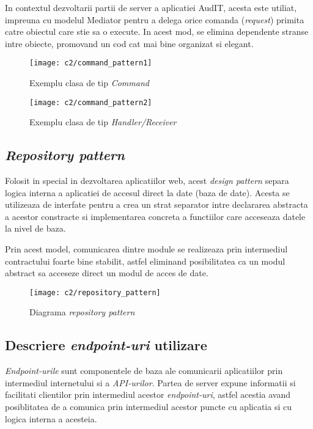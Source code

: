 In contextul dezvoltarii partii de server a aplicatiei AudIT, acesta este utiliat, impreuna cu modelul Mediator pentru a delega orice comanda (\textit{request}) primita catre obiectul care stie sa o execute. In acest mod, se elimina dependente stranse intre obiecte, promovand un cod cat mai bine organizat si elegant.\\

\vspace{1cm}
\begin{figure}[h]
	\centering
	
	\texttt{[image: c2/command\_pattern1]}
	\caption{Exemplu clasa de tip \textit{Command}}
\end{figure}



\vspace{1cm}
\begin{figure}[h]
	\centering
	
	\texttt{[image: c2/command\_pattern2]}
	\caption{Exemplu clasa de tip \textit{Handler/Receiver}}
\end{figure}


\subsection*{\textit{Repository pattern}}

Folosit in special in dezvoltarea aplicatiilor web, acest \textit{design pattern} separa logica interna a aplicatiei de accesul direct la date (baza de date). Acesta se utilizeaza de interfate pentru a crea un strat separator intre declararea abstracta a acestor constracte si implementarea concreta a functiilor care acceseaza datele la nivel de baza.

Prin acest model, comunicarea dintre module se realizeaza prin intermediul contractului foarte bine stabilit, astfel eliminand posibilitatea ca un modul abstract sa acceseze direct un modul de acces de date.\\


\vspace{1cm}
\begin{figure}[h]
	\centering
	
	\texttt{[image: c2/repository\_pattern]}
	\caption{Diagrama \textit{repository pattern}}
\end{figure}
\subsection*{Descriere \textit{endpoint-uri} utilizare}
\textit{Endpoint-urile} sunt componentele de baza ale comunicarii aplicatiilor prin intermediul internetului si a \textit{API-urilor}. Partea de server expune informatii si facilitati clientilor prin intermediul acestor \textit{endpoint-uri}, astfel acestia avand posiblitatea de a comunica prin intermediul acestor puncte cu aplicatia si cu logica interna a acesteia.

